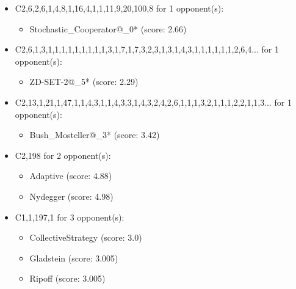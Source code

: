 \begin{appendices}
\begin{itemize}
    \item C2,6,2,6,1,4,8,1,16,4,1,1,11,9,20,100,8 for 1 opponent(s):
    \begin{multicols}{3}
         \begin{itemize}
            \item Stochastic\_Cooperator@\_0* (score: 2.66)
        \end{itemize}
     \end{multicols}
     
    \item C2,6,1,3,1,1,1,1,1,1,1,1,1,3,1,7,1,7,3,2,3,1,3,1,4,3,1,1,1,1,1,1,2,6,4... for 1 opponent(s):
    \begin{multicols}{3}
         \begin{itemize}
            \item ZD-SET-2@\_5* (score: 2.29)
        \end{itemize}
     \end{multicols}
     
    \item C2,13,1,21,1,47,1,1,4,3,1,1,4,3,3,1,4,3,2,4,2,6,1,1,1,3,2,1,1,1,2,2,1,1,3... for 1 opponent(s):
    \begin{multicols}{3}
         \begin{itemize}
            \item Bush\_Mosteller@\_3* (score: 3.42)
        \end{itemize}
     \end{multicols}
     
    \item C2,198 for 2 opponent(s):
    \begin{multicols}{3}
         \begin{itemize}
            \item Adaptive (score: 4.88)
            \item Nydegger (score: 4.98)
        \end{itemize}
     \end{multicols}
     
    \item C1,1,197,1 for 3 opponent(s):
    \begin{multicols}{3}
         \begin{itemize}
            \item CollectiveStrategy (score: 3.0)
            \item Gladstein (score: 3.005)
            \item Ripoff (score: 3.005)
        \end{itemize}
     \end{multicols}
     

\end{itemize}
\end{appendices}
